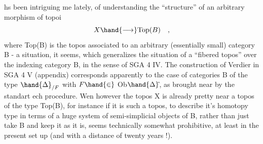 hs been intriguing me lately,  of understanding the ``structure'' of an
arbitrary morphism of topoi
\[ X \hand{\longrightarrow} \mathrm{Top}(B) \quad , \]
where Top(B) is the topos associated to an arbitrary (essentially small)
category B  -  a situation,  it seems,  which generalizes the situation
of a ``fibered topos'' over the indexing category B,  in the sense of
SGA 4 IV.  The construction of Verdier in SGA 4 V (appendix) corresponds
apparently to the case of categories B of the type $\hand{\Delta}_{/F}$  with $F \hand{\in}$ Ob$\hand{\Delta}\hat{}$,
as brought near by the standart ech procedure.  Wen however the topos X
is already pretty near a topos of the type Top(B),  for instance if it is
such a topos,  to describe it's homotopy type in terms of a huge  system
of semi-simplicial objects of B$\hat{}$,  rather than just take B and keep it as
\margin{$\uparrow$}it is,  seems technically somewhat prohibitive,  at least in the present
set up (and with a distance of twenty years !).

